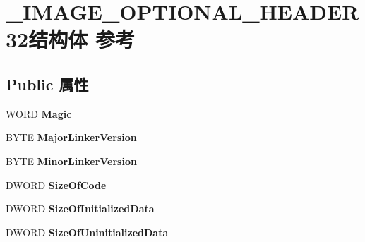 \hypertarget{struct___i_m_a_g_e___o_p_t_i_o_n_a_l___h_e_a_d_e_r32}{}\section{\+\_\+\+I\+M\+A\+G\+E\+\_\+\+O\+P\+T\+I\+O\+N\+A\+L\+\_\+\+H\+E\+A\+D\+E\+R32结构体 参考}
\label{struct___i_m_a_g_e___o_p_t_i_o_n_a_l___h_e_a_d_e_r32}
\subsection*{Public 属性}
\begin{DoxyCompactItemize}
\item 
\mbox{\label{struct___i_m_a_g_e___o_p_t_i_o_n_a_l___h_e_a_d_e_r32_a42b95c29b90ef7c3b9dec2a9a9ab7e64}} 
W\+O\+RD {\bfseries Magic}
\item 
\mbox{\label{struct___i_m_a_g_e___o_p_t_i_o_n_a_l___h_e_a_d_e_r32_a9c32e31deb8b0268dbac7068ecb1ade8}} 
B\+Y\+TE {\bfseries Major\+Linker\+Version}
\item 
\mbox{\label{struct___i_m_a_g_e___o_p_t_i_o_n_a_l___h_e_a_d_e_r32_a1ecb46d9e084433ef6626f65d2ec93b3}} 
B\+Y\+TE {\bfseries Minor\+Linker\+Version}
\item 
\mbox{\label{struct___i_m_a_g_e___o_p_t_i_o_n_a_l___h_e_a_d_e_r32_abeed57a9397af4d1157ad17d16c87db3}} 
D\+W\+O\+RD {\bfseries Size\+Of\+Code}
\item 
\mbox{\label{struct___i_m_a_g_e___o_p_t_i_o_n_a_l___h_e_a_d_e_r32_af9e3020e35a7edbc64d46a20aeb35a96}} 
D\+W\+O\+RD {\bfseries Size\+Of\+Initialized\+Data}
\item 
\mbox{\label{struct___i_m_a_g_e___o_p_t_i_o_n_a_l___h_e_a_d_e_r32_ab48bf62a231b9a824ddbee654472f54f}} 
D\+W\+O\+RD {\bfseries Size\+Of\+Uninitialized\+Data}
\item 

\end{DoxyCompactItemize}
